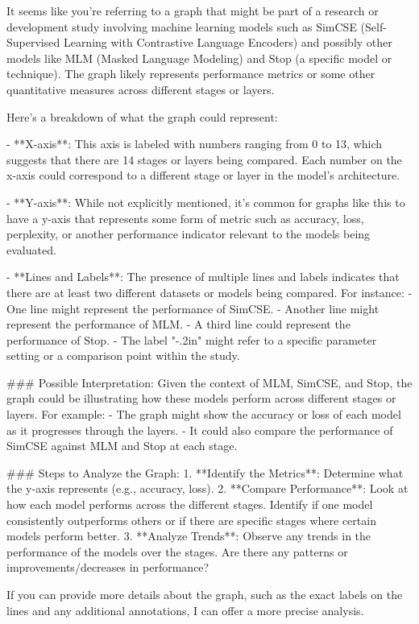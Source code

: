 It seems like you're referring to a graph that might be part of a research or development study involving machine learning models such as SimCSE (Self-Supervised Learning with Contrastive Language Encoders) and possibly other models like MLM (Masked Language Modeling) and Stop (a specific model or technique). The graph likely represents performance metrics or some other quantitative measures across different stages or layers.

Here's a breakdown of what the graph could represent:

- **X-axis**: This axis is labeled with numbers ranging from 0 to 13, which suggests that there are 14 stages or layers being compared. Each number on the x-axis could correspond to a different stage or layer in the model's architecture.
  
- **Y-axis**: While not explicitly mentioned, it's common for graphs like this to have a y-axis that represents some form of metric such as accuracy, loss, perplexity, or another performance indicator relevant to the models being evaluated.

- **Lines and Labels**: The presence of multiple lines and labels indicates that there are at least two different datasets or models being compared. For instance:
  - One line might represent the performance of SimCSE.
  - Another line might represent the performance of MLM.
  - A third line could represent the performance of Stop.
  - The label "-.2in" might refer to a specific parameter setting or a comparison point within the study.

### Possible Interpretation:
Given the context of MLM, SimCSE, and Stop, the graph could be illustrating how these models perform across different stages or layers. For example:
- The graph might show the accuracy or loss of each model as it progresses through the layers.
- It could also compare the performance of SimCSE against MLM and Stop at each stage.

### Steps to Analyze the Graph:
1. **Identify the Metrics**: Determine what the y-axis represents (e.g., accuracy, loss).
2. **Compare Performance**: Look at how each model performs across the different stages. Identify if one model consistently outperforms others or if there are specific stages where certain models perform better.
3. **Analyze Trends**: Observe any trends in the performance of the models over the stages. Are there any patterns or improvements/decreases in performance?

If you can provide more details about the graph, such as the exact labels on the lines and any additional annotations, I can offer a more precise analysis.